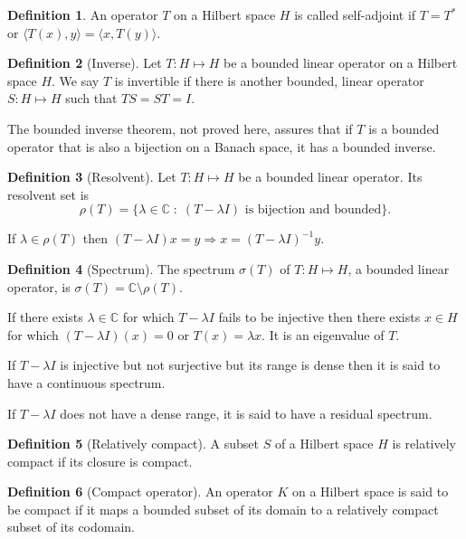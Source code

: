 \documentclass{article}
\theoremstyle{plain}
\numberwithin{thm}{section}
\theoremstyle{plain}
\numberwithin{prop}{section}
\theoremstyle{definition}
\newtheorem{defn}{Definition}
\numberwithin{defn}{section}
\theoremstyle{remark}
\numberwithin{equation}{section}
\begin{document}
\begin{defn}\label{s5d1}
An operator $T$ on a Hilbert space $H$ is called self-adjoint if $T = T^\ast$
or $\langle T(x), y\rangle = \langle x, T(y)\rangle$.
\end{defn}

\begin{defn}[Inverse]\label{s5d2}
Let $T: H \mapsto H$ be a bounded linear operator on a Hilbert space $H$. We
say $T$ is invertible if there is another bounded, linear operator $S: H \mapsto
H$ such that $TS = ST = I$.
\end{defn}

The bounded inverse theorem, not proved here, assures that if $T$ is a bounded
operator that is also a bijection on a Banach space, it has a bounded inverse.

\begin{defn}[Resolvent]\label{s5d3}
Let $T: H \mapsto H$ be a bounded linear operator. Its resolvent set is
\[
\rho(T) = \{\lambda \in \mathbb{C} \;:\; (T - \lambda I) \text{ is bijection and
bounded}\}.
\]
\end{defn}
If $\lambda \in \rho(T)$ then $(T - \lambda I)x = y \Rightarrow x = 
(T - \lambda I)^{-1}y$. 

\begin{defn}[Spectrum]\label{s5d4}
The spectrum $\sigma(T)$ of $T: H \mapsto H$, a bounded linear operator, is
$\sigma(T) = \mathbb{C} \setminus \rho(T)$.
\end{defn}

If there exists $\lambda \in \mathbb{C}$ for which $T - \lambda I$ fails to be
injective then there exists $x \in H$ for which $(T - \lambda I)(x) = 0$ or
$T(x) = \lambda x$. It is an eigenvalue of $T$.

If $T - \lambda I$ is injective but not surjective but its range is dense then
it is said to have a continuous spectrum.

If $T - \lambda I$ does not have a dense range, it is said to have a residual
spectrum.

\begin{defn}[Relatively compact]\label{s5d5}
A subset $S$ of a Hilbert space $H$ is relatively compact if its closure is 
compact.
\end{defn}

\begin{defn}[Compact operator]\label{s5d6}
An operator $K$ on a Hilbert space is said to be compact if it maps a bounded
subset of its domain to a relatively compact subset of its codomain.
\end{defn}
\end{document}
